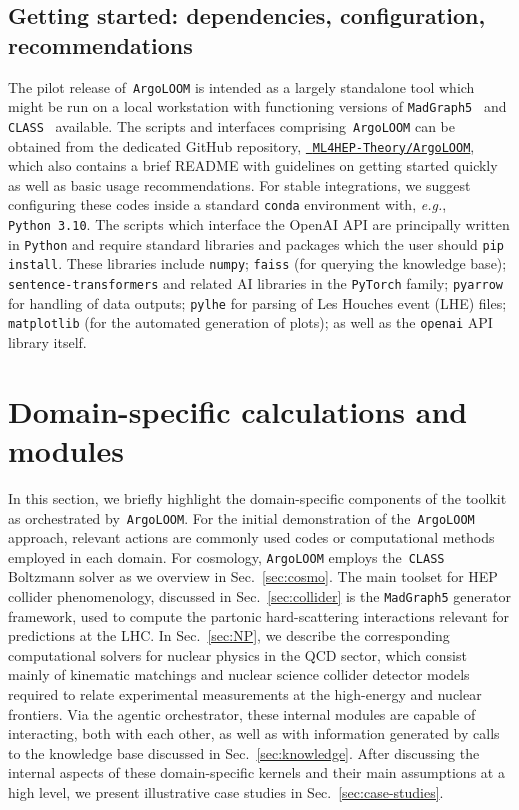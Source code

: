 \documentclass[final,3p,times,sort,compress]{elsarticle}
\newcommand{\repoURL}{https://github.com/ML4HEP-Theory/ArgoLOOM.git}
\newcommand{\repoText}{\texttt{ML4HEP-Theory/ArgoLOOM}}
\newcommand{\AL}{\texttt{ArgoLOOM}\xspace}
\newcommand{\CLASS}{\texttt{CLASS}\xspace}
\newcommand{\MG}{\texttt{MadGraph5}\xspace}
\begin{document}
%
\subsection{Getting started: dependencies, configuration, recommendations}
\label{sec:startup}
%
The pilot release of~\AL is intended as a largely standalone tool which might be run on a local workstation with functioning versions of \MG~\cite{Alwall:2011uj} and \CLASS~\cite{Lesgourgues:2011re} available.
%
The scripts and interfaces comprising~\AL can be obtained from the dedicated GitHub repository, \href{\repoURL}{\faGithub\ \repoText}, which
also contains a brief README with guidelines on getting started quickly as well as basic usage recommendations.
%
For stable integrations, we suggest configuring these codes inside a standard \texttt{conda} environment with, {\it e.g.}, \texttt{Python}~\texttt{3.10}.
%
The scripts which interface the OpenAI API are principally written in \texttt{Python} and require standard libraries and packages which the user should \texttt{pip install}.
%
These libraries include \texttt{numpy}; \texttt{faiss} (for querying the knowledge base); \texttt{sentence-transformers} and related AI libraries in the \texttt{PyTorch} family; \texttt{pyarrow} for handling of data outputs; \texttt{pylhe} for parsing of Les Houches event (LHE) files; \texttt{matplotlib} (for the automated generation of plots); as well as the \texttt{openai} API library itself.


\section{Domain-specific calculations and modules}
\label{sec:modules}
%
In this section, we briefly highlight the domain-specific components of the
toolkit as orchestrated by~\AL.
%
For the initial demonstration of the~\AL approach, relevant actions are commonly used codes or computational methods employed in each domain.
%
For cosmology, \AL employs the~\CLASS Boltzmann solver as we overview in Sec.~\ref{sec:cosmo}.
%
The main toolset for HEP collider phenomenology, discussed in Sec.~\ref{sec:collider} is the \MG generator framework, used to compute the partonic hard-scattering interactions relevant for predictions at the LHC.
%
In Sec.~\ref{sec:NP}, we describe the corresponding computational solvers for nuclear physics in the QCD sector, which consist mainly of kinematic matchings and nuclear science collider detector models required to relate experimental measurements at the high-energy and nuclear frontiers.
%
Via the agentic orchestrator, these internal modules are capable of interacting, both with each other, as well as with information generated by calls to the knowledge base discussed in Sec.~\ref{sec:knowledge}.
%
After discussing the internal aspects of these domain-specific kernels and their main assumptions at a high level, we present illustrative case studies in Sec.~\ref{sec:case-studies}.
\end{document}
